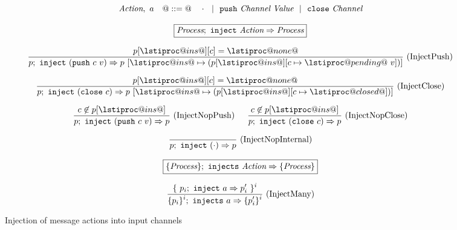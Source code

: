 
\begin{figure}

$$
\textit{Action},~a  ~~~ @::=@ ~~~ \cdot ~~|~~ \texttt{push}~\textit{Channel}~\textit{Value} ~~|~~ \texttt{close}~\textit{Channel}
$$

$$
\boxed{\textit{Process};~\texttt{inject}~\textit{Action} \Rightarrow \textit{Process}}
$$

$$
\ruleIN{
  p[\lstiproc@ins@][c] = \lstiproc@none@
}{
  \ProcInject{p}{(\Push~c~v)}{p~[\lstiproc@ins@ \mapsto (p[\lstiproc@ins@][c \mapsto \lstiproc@pending@~v]) ] }
}{InjectPush}
$$

$$
\ruleIN{
  p[\lstiproc@ins@][c] = \lstiproc@none@
}{
  \ProcInject{p}{(\Close~c)}{p~[\lstiproc@ins@ \mapsto (p[\lstiproc@ins@][c \mapsto \lstiproc@closed@]) ] }
}{InjectClose}
$$

$$
\ruleIN{
  c \not\in p[\lstiproc@ins@]
}{
  \ProcInject{p}{(\Push~c~v)}{p}
}{InjectNopPush}
%
\enskip
%
\ruleIN{
  c \not\in p[\lstiproc@ins@]
}{
  \ProcInject{p}{(\Close~c)}{p}
}{InjectNopClose}
$$

$$
\enskip \frac {\displaystyle } {\displaystyle 
  p;~\texttt{inject}~(\cdot) \Rightarrow p
} \  \mbox{(InjectNopInternal)} \enskip
$$


$$
\boxed{\{ \textit{Process} \};~\texttt{injects}~\textit{Action} \Rightarrow \{ \textit{Process} \}}
$$

$$
\enskip \frac {\displaystyle 
  \{~ p_i;~\texttt{inject}~a \Rightarrow p'_i ~\}^i
} {\displaystyle 
  \{ p_i \}^i;~\texttt{injects}~a \Rightarrow \{ p'_i \}^i
} \  \mbox{(InjectMany)} \enskip
$$

\caption{Injection of message actions into input channels}
\label{fig:Process:Eval:Inject}
\end{figure}


